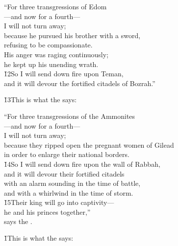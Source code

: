 \begin{poetry}
\poeml ``For three transgressions of Edom \\
\poemll    ---and now for a fourth--- \\
\poemlll       I will not turn away; \\
\poeml because he pursued his brother with a sword, \\
\poemll    refusing to be compassionate. \\
\poeml His anger was raging continuously; \\
\poemll    he kept up his unending wrath. \\
\poeml \v{12}So I will send down fire upon Teman, \\
\poemll    and it will devour the fortified citadels of Bozrah.''
\end{poetry}

\v{13}This is what the  says:

\begin{poetry}
\poeml ``For three transgressions of the Ammonites \\
\poemll    ---and now for a fourth--- \\
\poemlll       I will not turn away; \\
\poeml because they ripped open the pregnant women of Gilead \\
\poemll    in order to enlarge their national borders. \\
\poeml \v{14}So I will send down fire upon the wall of Rabbah, \\
\poemll    and it will devour their fortified citadels \\
\poemlll       with an alarm sounding in the time of battle, \\
\poemll    and with a whirlwind in the time of storm. \\
\poeml \v{15}Their king will go into captivity--- \\
\poemll    he and his princes together,'' \\
\poemlll       says the .
\end{poetry}

\v{1}This is what the  says:


